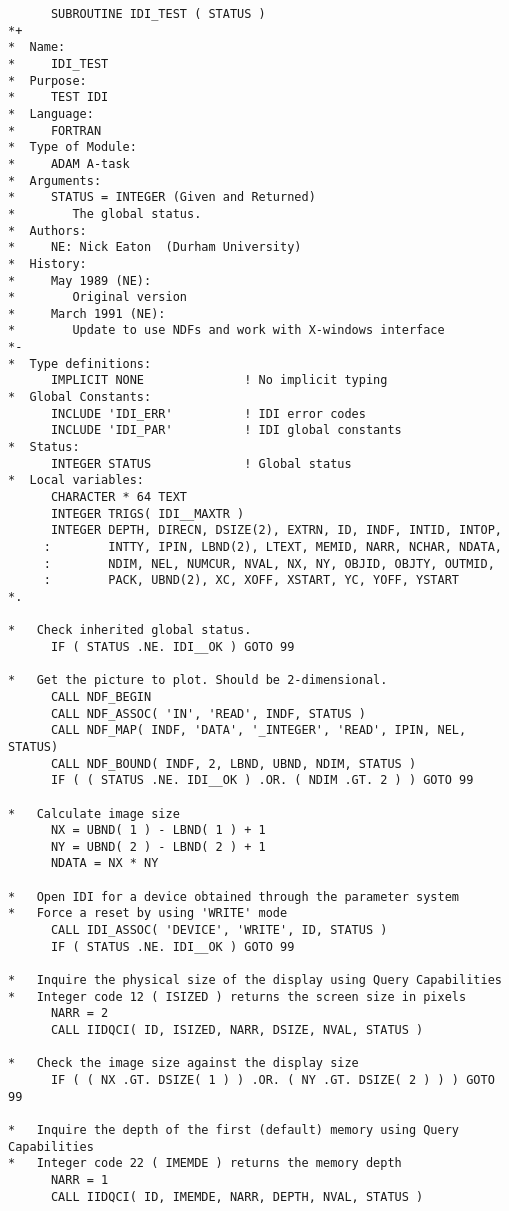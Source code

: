 \begin{small}
\begin{verbatim}
      SUBROUTINE IDI_TEST ( STATUS )
*+
*  Name:
*     IDI_TEST
*  Purpose:
*     TEST IDI
*  Language:
*     FORTRAN
*  Type of Module:
*     ADAM A-task
*  Arguments:
*     STATUS = INTEGER (Given and Returned)
*        The global status.
*  Authors:
*     NE: Nick Eaton  (Durham University)
*  History:
*     May 1989 (NE):
*        Original version
*     March 1991 (NE):
*        Update to use NDFs and work with X-windows interface
*-
*  Type definitions:
      IMPLICIT NONE              ! No implicit typing
*  Global Constants:
      INCLUDE 'IDI_ERR'          ! IDI error codes
      INCLUDE 'IDI_PAR'          ! IDI global constants
*  Status:
      INTEGER STATUS             ! Global status
*  Local variables:
      CHARACTER * 64 TEXT
      INTEGER TRIGS( IDI__MAXTR )
      INTEGER DEPTH, DIRECN, DSIZE(2), EXTRN, ID, INDF, INTID, INTOP,
     :        INTTY, IPIN, LBND(2), LTEXT, MEMID, NARR, NCHAR, NDATA,
     :        NDIM, NEL, NUMCUR, NVAL, NX, NY, OBJID, OBJTY, OUTMID,
     :        PACK, UBND(2), XC, XOFF, XSTART, YC, YOFF, YSTART
*.

*   Check inherited global status.
      IF ( STATUS .NE. IDI__OK ) GOTO 99

*   Get the picture to plot. Should be 2-dimensional.
      CALL NDF_BEGIN
      CALL NDF_ASSOC( 'IN', 'READ', INDF, STATUS )
      CALL NDF_MAP( INDF, 'DATA', '_INTEGER', 'READ', IPIN, NEL, STATUS)
      CALL NDF_BOUND( INDF, 2, LBND, UBND, NDIM, STATUS )
      IF ( ( STATUS .NE. IDI__OK ) .OR. ( NDIM .GT. 2 ) ) GOTO 99

*   Calculate image size
      NX = UBND( 1 ) - LBND( 1 ) + 1
      NY = UBND( 2 ) - LBND( 2 ) + 1
      NDATA = NX * NY

*   Open IDI for a device obtained through the parameter system
*   Force a reset by using 'WRITE' mode
      CALL IDI_ASSOC( 'DEVICE', 'WRITE', ID, STATUS )
      IF ( STATUS .NE. IDI__OK ) GOTO 99

*   Inquire the physical size of the display using Query Capabilities
*   Integer code 12 ( ISIZED ) returns the screen size in pixels
      NARR = 2
      CALL IIDQCI( ID, ISIZED, NARR, DSIZE, NVAL, STATUS )

*   Check the image size against the display size
      IF ( ( NX .GT. DSIZE( 1 ) ) .OR. ( NY .GT. DSIZE( 2 ) ) ) GOTO 99

*   Inquire the depth of the first (default) memory using Query Capabilities
*   Integer code 22 ( IMEMDE ) returns the memory depth
      NARR = 1
      CALL IIDQCI( ID, IMEMDE, NARR, DEPTH, NVAL, STATUS )


\end{verbatim}
\end{small}
